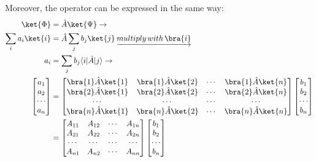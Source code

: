 Moreover, the operator can be expressed in the same way:
\begin{align}\label{REPRESENTATIONeq:5}
\ket{\Phi} &= \hat{A}\ket{\Psi} \rightarrow \nonumber \\
\sum_{i}a_{i}\ket{i} &= \hat{A}\sum_{j}b_{j}\ket{j}
\: \underrightarrow{multiply \, with \, \bra{i} }\nonumber \\
a_{i} &= \sum_{j}b_{j}\langle i|\hat{A}|j\rangle \rightarrow \nonumber \\
\begin{bmatrix}
  a_{1} \\
  a_{2} \\
  \cdots \\
  a_{n} \\
\end{bmatrix}
&= \begin{bmatrix}
     \bra{1}\hat{A}\ket{1} & \bra{1}\hat{A}\ket{2} & \cdots & \bra{1}\hat{A}\ket{n} \\
     \bra{2}\hat{A}\ket{1} & \bra{2}\hat{A}\ket{2} & \cdots & \bra{2}\hat{A}\ket{n} \\
     \cdots                &                \cdots & \cdots & \cdots                \\
     \bra{n}\hat{A}\ket{1} & \bra{n}\hat{A}\ket{2} & \cdots & \bra{n}\hat{A}\ket{n} \\
   \end{bmatrix}
\begin{bmatrix}
  b_{1} \\
  b_{2} \\
  \cdots \\
  b_{n} \\
\end{bmatrix} \nonumber \\
&= \begin{bmatrix}
     A_{11} & A_{12} & \cdots & A_{1n} \\
     A_{21} & A_{22} & \cdots & A_{2n} \\
     \cdots & \cdots & \cdots & \cdots \\
     A_{n1} & A_{n2} & \cdots & A_{nn} \\
   \end{bmatrix}
\begin{bmatrix}
  b_{1} \\
  b_{2} \\
  \cdots \\
  b_{n} \\
\end{bmatrix}
\end{align}

